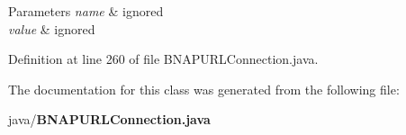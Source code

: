 \begin{DoxyParams}{Parameters}
{\em name} & ignored \\
\hline
{\em value} & ignored \\
\hline
\end{DoxyParams}


Definition at line 260 of file B\+N\+A\+P\+U\+R\+L\+Connection.\+java.



The documentation for this class was generated from the following file\+:\begin{DoxyCompactItemize}
\item 
java/{\bf B\+N\+A\+P\+U\+R\+L\+Connection.\+java}\end{DoxyCompactItemize}
